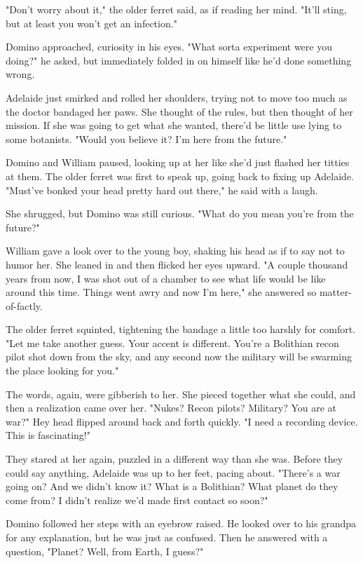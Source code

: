 "Don't worry about it," the older ferret said, as if reading her mind. "It'll sting, but at least you won't get an infection."

Domino approached, curiosity in his eyes. "What sorta experiment were you doing?" he asked, but immediately folded in on himself like he'd done something wrong.

Adelaide just smirked and rolled her shoulders, trying not to move too much as the doctor bandaged her paws. She thought of the rules, but then thought of her mission. If she was going to get what she wanted, there'd be little use lying to some botanists. "Would you believe it? I'm here from the future."

Domino and William paused, looking up at her like she'd just flashed her titties at them. The older ferret was first to speak up, going back to fixing up Adelaide. "Must've bonked your head pretty hard out there," he said with a laugh.

She shrugged, but Domino was still curious. "What do you mean you're from the future?"

William gave a look over to the young boy, shaking his head as if to say not to humor her. She leaned in and then flicked her eyes upward. "A couple thousand years from now, I was shot out of a chamber to see what life would be like around this time. Things went awry and now I'm here," she answered so matter-of-factly.

The older ferret squinted, tightening the bandage a little too harshly for comfort. "Let me take another guess. Your accent is different. You're a Bolithian recon pilot shot down from the sky, and any second now the military will be swarming the place looking for you."

The words, again, were gibberish to her. She pieced together what she could, and then a realization came over her. "Nukes? Recon pilots? Military? You are at war?" Hey head flipped around back and forth quickly. "I need a recording device. This is fascinating!"

They stared at her again, puzzled in a different way than she was. Before they could say anything, Adelaide was up to her feet, pacing about. "There's a war going on? And we didn't know it? What is a Bolithian? What planet do they come from? I didn't realize we'd made first contact so soon?"

Domino followed her steps with an eyebrow raised. He looked over to his grandpa for any explanation, but he was just as confused. Then he answered with a question, "Planet? Well, from Earth, I guess?"

